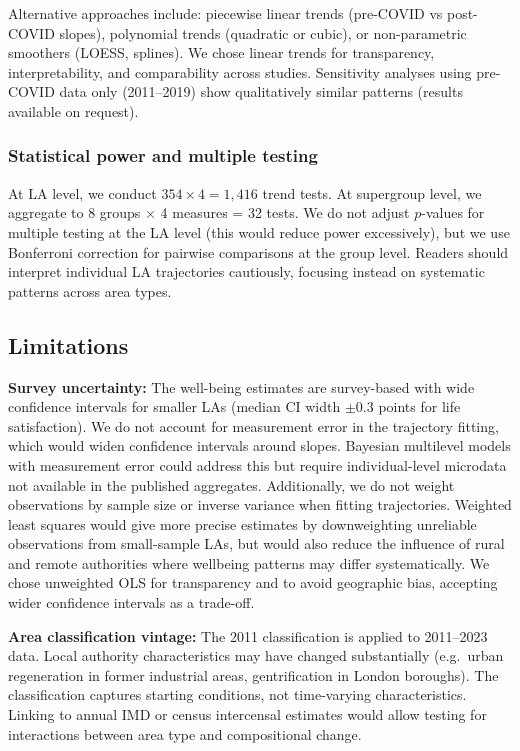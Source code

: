 \documentclass[12pt,a4paper]{article}
\begin{document}
Alternative approaches include: piecewise linear trends (pre-COVID vs post-COVID slopes), polynomial trends (quadratic or cubic), or non-parametric smoothers (LOESS, splines). We chose linear trends for transparency, interpretability, and comparability across studies. Sensitivity analyses using pre-COVID data only (2011--2019) show qualitatively similar patterns (results available on request).

\subsubsection{Statistical power and multiple testing}

At LA level, we conduct $354 \times 4 = 1{,}416$ trend tests. At supergroup level, we aggregate to 8 groups $\times$ 4 measures = 32 tests. We do not adjust $p$-values for multiple testing at the LA level (this would reduce power excessively), but we use Bonferroni correction for pairwise comparisons at the group level. Readers should interpret individual LA trajectories cautiously, focusing instead on systematic patterns across area types.

\subsection{Limitations}

\textbf{Survey uncertainty:} The well-being estimates are survey-based with wide confidence intervals for smaller LAs (median CI width $\pm 0.3$ points for life satisfaction). We do not account for measurement error in the trajectory fitting, which would widen confidence intervals around slopes. Bayesian multilevel models with measurement error could address this but require individual-level microdata not available in the published aggregates. Additionally, we do not weight observations by sample size or inverse variance when fitting trajectories. Weighted least squares would give more precise estimates by downweighting unreliable observations from small-sample LAs, but would also reduce the influence of rural and remote authorities where wellbeing patterns may differ systematically. We chose unweighted OLS for transparency and to avoid geographic bias, accepting wider confidence intervals as a trade-off.

\textbf{Area classification vintage:} The 2011 classification is applied to 2011--2023 data. Local authority characteristics may have changed substantially (e.g.\ urban regeneration in former industrial areas, gentrification in London boroughs). The classification captures starting conditions, not time-varying characteristics. Linking to annual IMD or census intercensal estimates would allow testing for interactions between area type and compositional change.
\end{document}
